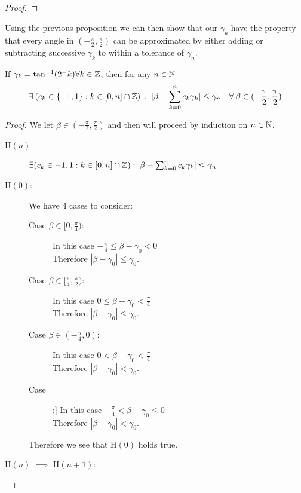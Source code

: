{\begin{proof}
\end{proof}

Using the previous proposition we can then show that our \(\gamma_k\) have the property that every angle in \((-\frac{\pi}{2}, \frac{\pi}{2})\) can be approximated by either adding or subtracting successive \(\gamma_k\) to within a tolerance of \(\gamma_n\).

\begin{Cordic Accuracy}
\label{THM_"Cordic Accuracy"}
If \(\gamma_k = \tan^{-1}(2^-k) \forall k \in \mathbb{Z}\), then for any \(n \in \mathbb{N}\) 
\[\exists \: (c_k\in \{-1,1\} : k \in [0,n] \cap \mathbb{Z}) \: : \: |\beta - \sum_{k=0}^nc_k\gamma_k| \le \gamma_n \quad \forall \: \beta \in (-\frac{\pi}{2}, \frac{\pi}{2})\]
\end{Cordic Accuracy}
\begin{proof}
We let \(\beta \in (-\frac{\pi}{2}, \frac{\pi}{2})\) and then will proceed by induction on \(n \in \mathbb{N}\).
\begin{description}
\item[\textrm{H\((n)\)}:] 
	\(\exists (c_k \in{-1, 1} : k \in [0, n] \cap \mathbb{Z}) : |\beta - \sum_{k=0}^nc_k\gamma_k| \le \gamma_n\)\\
\item[\textrm{H\((0)\)}:] 
	We have 4 cases to consider:\\
	\begin{description}
	\item[Case \(\beta \in [0, \frac{\pi}{4})\):]
		In this case \(-\frac{\pi}{4} \le \beta - \gamma_0 < 0\)\\
		Therefore \(|\beta - \gamma_0| \le \gamma_0\).
	\item[Case \(\beta \in [\frac{\pi}{4}, \frac{\pi}{2})\):]
		In this case \(0 \le \beta - \gamma_0 < \frac{\pi}{4}\)\\
		Therefore \(|\beta - \gamma_0| \le \gamma_0\).
	\item[Case \(\beta \in (-\frac{\pi}{4}, 0)\):]
		In this case \(0 < \beta + \gamma_0 < \frac{\pi}{4}\)\\
		Therefore \(|\beta - \gamma_0| < \gamma_0\).
	\item[Case \(\beta \in (-\frac{\pi}{2}, -\frac{\pi}{4}]\):]
		In this case \(-\frac{\pi}{4} < \beta - \gamma_0 \le 0\)\\
		Therefore \(|\beta - \gamma_0| < \gamma_0\).
	\end{description}
	Therefore we see that \textrm{H\((0)\)} holds true.
\item[\textrm{H\((n)\) \(\implies\) H\((n+1)\)}:]\hfill\break

\end{description}
\end{proof}}
